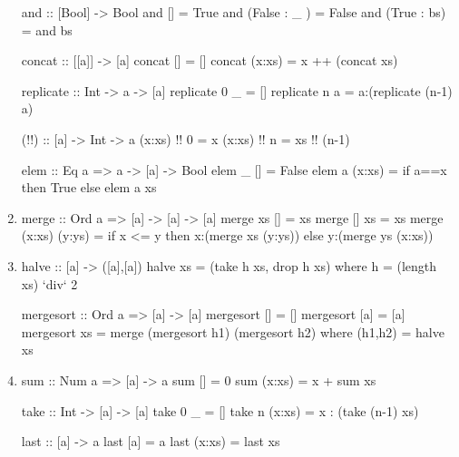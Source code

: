 \documentclass{article}
\begin{document}
\begin{enumerate}
\begin{code}
and :: [Bool] -> Bool
and [] = True
and (False : _ ) = False
and (True : bs) = and bs
\end{code}

\begin{code}
concat :: [[a]] -> [a]
concat [] = []
concat (x:xs) = x ++ (concat xs) 
\end{code}

\begin{code}
replicate :: Int -> a -> [a]
replicate 0 _ = []
replicate n a = a:(replicate (n-1) a)
\end{code}

\begin{code}
(!!) :: [a] -> Int -> a
(x:xs) !! 0 = x
(x:xs) !! n = xs !! (n-1)
\end{code}

\begin{code}
elem :: Eq a => a -> [a] -> Bool
elem _ [] = False
elem a (x:xs) = if a==x then True else elem a xs
\end{code}

\item 
\begin{code}
merge :: Ord a => [a] -> [a] -> [a]
merge xs [] = xs
merge [] xs = xs
merge (x:xs) (y:ys) = if x <= y then x:(merge xs (y:ys)) else y:(merge ys (x:xs))
\end{code}

\item
\begin{code}
halve :: [a] -> ([a],[a])
halve xs = (take h xs, drop h xs)
            where
                h = (length xs) `div` 2

mergesort :: Ord a => [a] -> [a]
mergesort []  = []
mergesort [a] = [a]
mergesort xs  = merge (mergesort h1) (mergesort h2) where (h1,h2) = halve xs
\end{code}

\item 
\begin{code}
sum :: Num a => [a] -> a
sum [] = 0
sum (x:xs) = x + sum xs
\end{code}

\begin{code}
take :: Int -> [a] -> [a]
take 0 _ = []
take n (x:xs) = x : (take (n-1) xs)
\end{code}

\begin{code}
last :: [a] -> a
last [a] = a
last (x:xs) = last xs
\end{code}
\end{enumerate}
\end{document}
